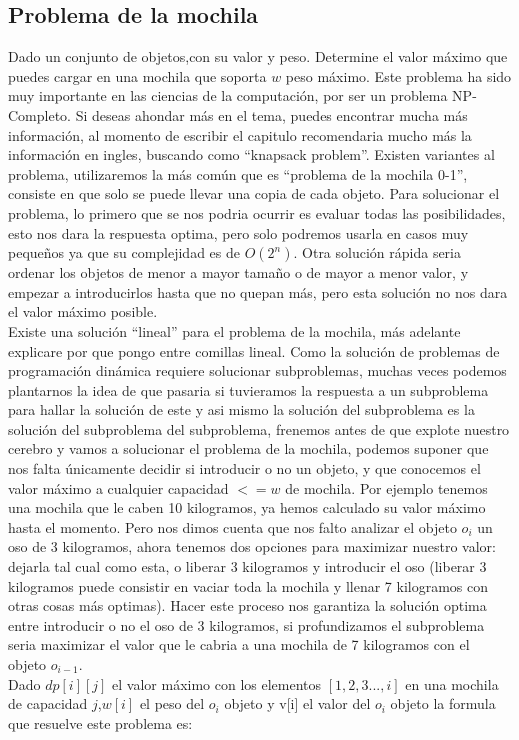 \subsection{Problema de la mochila}
Dado un conjunto de objetos,con su valor y peso. Determine el valor máximo que puedes cargar en una mochila que soporta $w$ peso máximo.
Este problema ha sido muy importante en las ciencias de la computación, por ser un problema NP-Completo. Si deseas ahondar más en el tema, puedes encontrar mucha más información, al momento de escribir el capitulo recomendaria mucho más la información en ingles, buscando como ``knapsack problem''. Existen variantes al problema, utilizaremos la más común que es ``problema de la mochila 0-1'', consiste en que solo se puede llevar una copia de cada objeto. 
Para solucionar el problema, lo primero que se nos podria ocurrir es evaluar todas las posibilidades, esto nos dara la respuesta optima, pero solo podremos usarla en casos muy pequeños ya que su complejidad es de $O(2^n)$. Otra solución rápida seria ordenar los objetos de menor a mayor tamaño o de mayor a menor valor, y empezar a introducirlos hasta que no quepan más,  pero esta solución no nos dara el valor máximo posible.
\\Existe una solución ``lineal'' para el problema de la mochila, más adelante explicare por que pongo entre comillas lineal. Como la solución de problemas de programación dinámica requiere solucionar subproblemas, muchas veces podemos plantarnos la idea de que pasaria si tuvieramos la respuesta a un subproblema para hallar la solución de este y asi mismo la solución del subproblema es la solución del subproblema del subproblema, frenemos antes de que explote nuestro cerebro y vamos a solucionar el problema de la mochila, podemos suponer que nos falta únicamente decidir si introducir o no un objeto, y que conocemos el valor máximo a cualquier capacidad $<=w$ de mochila. Por ejemplo tenemos una mochila que le caben 10 kilogramos, ya hemos calculado su valor máximo hasta el momento. Pero nos dimos cuenta que nos falto analizar el objeto $o_i$ un oso de 3 kilogramos, ahora tenemos dos opciones para maximizar nuestro valor: dejarla tal cual como esta, o liberar 3 kilogramos y introducir el oso (liberar 3 kilogramos puede consistir en vaciar toda la mochila y llenar 7 kilogramos con otras cosas más optimas). Hacer este proceso nos garantiza la solución optima entre introducir o no el oso de 3 kilogramos, si profundizamos el subproblema seria maximizar el valor que le cabria a una mochila de 7 kilogramos con el objeto $o_{i-1}$.
\\Dado $dp[i][j]$ el valor máximo con los elementos $[1,2,3...,i]$ en una mochila de capacidad $j$,$w[i]$ el peso del $o_i$ objeto y v[i] el valor del $o_i$ objeto la formula que resuelve este problema es:

